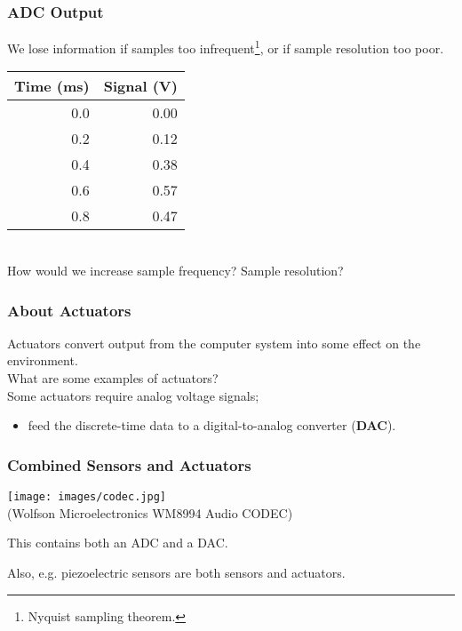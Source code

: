 \begin{frame}
\frametitle{ADC Output}

We lose information if samples too infrequent\footnote{Nyquist sampling theorem.}, or if sample resolution too poor.

\begin{center}
\begin{tabular}{r|r}
Time (ms) & Signal (V) \\ \hline
0.0 & 0.00 \\
0.2 & 0.12 \\
0.4 & 0.38 \\
0.6 & 0.57 \\
0.8 & 0.47 \\
\end{tabular}
\end{center}

~\\[1em]
How would we increase sample frequency? Sample resolution?
\end{frame}

\begin{frame}
\frametitle{About Actuators}

Actuators convert output from the computer
system into some effect on the environment. \\[1em]

What are some examples of actuators?\\[4em] 

Some actuators require analog voltage signals;
\begin{itemize}
\item feed the discrete-time data to a digital-to-analog converter
({\bf DAC}).
\end{itemize}

\end{frame}

\begin{frame}
\frametitle{Combined Sensors and Actuators}

\begin{center}
\texttt{[image: images/codec.jpg]}\\
\hfill (Wolfson Microelectronics WM8994 Audio CODEC)
\end{center}

This contains both an ADC and a DAC.

Also, e.g. piezoelectric sensors are both sensors and actuators.

\end{frame}


